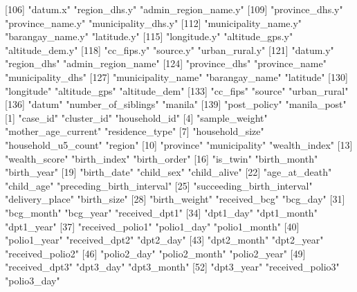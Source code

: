 [106] "datum.x"                   "region_dhs.y"              "admin_region_name.y"      
[109] "province_dhs.y"            "province_name.y"           "municipality_dhs.y"       
[112] "municipality_name.y"       "barangay_name.y"           "latitude.y"               
[115] "longitude.y"               "altitude_gps.y"            "altitude_dem.y"           
[118] "cc_fips.y"                 "source.y"                  "urban_rural.y"            
[121] "datum.y"                   "region_dhs"                "admin_region_name"        
[124] "province_dhs"              "province_name"             "municipality_dhs"         
[127] "municipality_name"         "barangay_name"             "latitude"                 
[130] "longitude"                 "altitude_gps"              "altitude_dem"             
[133] "cc_fips"                   "source"                    "urban_rural"              
[136] "datum"                     "number_of_siblings"        "manila"                   
[139] "post_policy"               "manila_post"              
  [1] "case_id"                   "cluster_id"                "household_id"             
  [4] "sample_weight"             "mother_age_current"        "residence_type"           
  [7] "household_size"            "household_u5_count"        "region"                   
 [10] "province"                  "municipality"              "wealth_index"             
 [13] "wealth_score"              "birth_index"               "birth_order"              
 [16] "is_twin"                   "birth_month"               "birth_year"               
 [19] "birth_date"                "child_sex"                 "child_alive"              
 [22] "age_at_death"              "child_age"                 "preceding_birth_interval" 
 [25] "succeeding_birth_interval" "delivery_place"            "birth_size"               
 [28] "birth_weight"              "received_bcg"              "bcg_day"                  
 [31] "bcg_month"                 "bcg_year"                  "received_dpt1"            
 [34] "dpt1_day"                  "dpt1_month"                "dpt1_year"                
 [37] "received_polio1"           "polio1_day"                "polio1_month"             
 [40] "polio1_year"               "received_dpt2"             "dpt2_day"                 
 [43] "dpt2_month"                "dpt2_year"                 "received_polio2"          
 [46] "polio2_day"                "polio2_month"              "polio2_year"              
 [49] "received_dpt3"             "dpt3_day"                  "dpt3_month"               
 [52] "dpt3_year"                 "received_polio3"           "polio3_day"               
